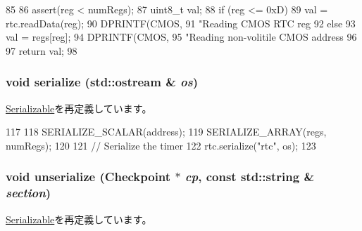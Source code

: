 \begin{DoxyCode}
85 {
86     assert(reg < numRegs);
87     uint8_t val;
88     if (reg <= 0xD) {
89         val = rtc.readData(reg);
90         DPRINTF(CMOS,
91             "Reading CMOS RTC reg %
92     } else {
93         val = regs[reg];
94         DPRINTF(CMOS,
95             "Reading non-volitile CMOS address %
96     }
97     return val;
98 }
\end{DoxyCode}
\hypertarget{classX86ISA_1_1Cmos_a53e036786d17361be4c7320d39c99b84}{
\subsubsection[{serialize}]{\setlength{\rightskip}{0pt plus 5cm}void serialize (std::ostream \& {\em os})}}
\label{classX86ISA_1_1Cmos_a53e036786d17361be4c7320d39c99b84}


\hyperlink{classSerializable_ad6272f80ae37e8331e3969b3f072a801}{Serializable}を再定義しています。


\begin{DoxyCode}
117 {
118     SERIALIZE_SCALAR(address);
119     SERIALIZE_ARRAY(regs, numRegs);
120 
121     // Serialize the timer
122     rtc.serialize("rtc", os);
123 }
\end{DoxyCode}
\hypertarget{classX86ISA_1_1Cmos_af22e5d6d660b97db37003ac61ac4ee49}{
\subsubsection[{unserialize}]{\setlength{\rightskip}{0pt plus 5cm}void unserialize ({\bf Checkpoint} $\ast$ {\em cp}, \/  const std::string \& {\em section})}}
\label{classX86ISA_1_1Cmos_af22e5d6d660b97db37003ac61ac4ee49}


\hyperlink{classSerializable_af100c4e9feabf3cd918619c88c718387}{Serializable}を再定義しています。


